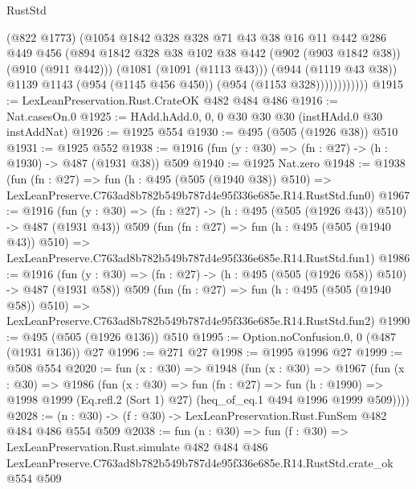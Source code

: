 \begin{lexlean}{RustStd}
\begin{coremodule}
                      (@822 @1773)
                      (@1054
                        @1842
                        @328
                        @328
                        @71
                        @43
                        @38
                        @16
                        @11
                        @442
                        @286
                        @449
                        @456
                        (@894
                          @1842
                          @328
                          @38
                          @102
                          @38
                          @442
                          (@902 (@903 @1842 @38))
                          (@910 (@911 @442)))
                        (@1081 (@1091 (@1113 @43)))
                        (@944 (@1119 @43 @38))
                        @1139
                        @1143
                        (@954 (@1145 @456 @450))
                        (@954 (@1153 @328))))))))))))
@1915 := LexLeanPreservation.Rust.CrateOK @482 @484 @486
@1916 := Nat.casesOn.{0}
@1925 := HAdd.hAdd.{0, 0, 0} @30 @30 @30 (instHAdd.{0} @30 instAddNat)
@1926 := @1925 @554
@1930 := @495 (@505 (@1926 @38)) @510
@1931 := @1925 @552
@1938 := @1916 (fun (y : @30) => (fn : @27) -> (h : @1930) -> @487 (@1931 @38)) @509
@1940 := @1925 Nat.zero
@1948 := @1938
    (fun (fn : @27) =>
    fun (h : @495 (@505 (@1940 @38)) @510) =>
    LexLeanPreserve.C763ad8b782b549b787d4e95f336e685e.R14.RustStd.fun0)
@1967 := @1916
    (fun (y : @30) => (fn : @27) -> (h : @495 (@505 (@1926 @43)) @510) -> @487 (@1931 @43))
    @509
    (fun (fn : @27) =>
    fun (h : @495 (@505 (@1940 @43)) @510) =>
    LexLeanPreserve.C763ad8b782b549b787d4e95f336e685e.R14.RustStd.fun1)
@1986 := @1916
    (fun (y : @30) => (fn : @27) -> (h : @495 (@505 (@1926 @58)) @510) -> @487 (@1931 @58))
    @509
    (fun (fn : @27) =>
    fun (h : @495 (@505 (@1940 @58)) @510) =>
    LexLeanPreserve.C763ad8b782b549b787d4e95f336e685e.R14.RustStd.fun2)
@1990 := @495 (@505 (@1926 @136)) @510
@1995 := Option.noConfusion.{0, 0} (@487 (@1931 @136)) @27
@1996 := @271 @27
@1998 := @1995 @1996 @27
@1999 := @508 @554
@2020 := fun (x : @30) =>
  @1948
    (fun (x : @30) =>
    @1967
      (fun (x : @30) =>
      @1986
        (fun (x : @30) =>
        fun (fn : @27) =>
        fun (h : @1990) =>
        @1998 @1999 (Eq.refl.{2} (Sort 1) @27) (heq_of_eq.{1} @494 @1996 @1999 @509))))
@2028 := (n : @30) -> (f : @30) -> LexLeanPreservation.Rust.FunSem @482 @484 @486 @554 @509
@2038 := fun (n : @30) =>
  fun (f : @30) =>
  LexLeanPreservation.Rust.simulate
    @482
    @484
    @486
    LexLeanPreserve.C763ad8b782b549b787d4e95f336e685e.R14.RustStd.crate_ok
    @554
    @509
\end{coremodule}
\end{lexlean}
